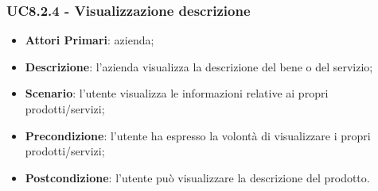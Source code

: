 \subsubsection{UC8.2.4 - Visualizzazione descrizione}
\begin{itemize}
	\item \textbf{Attori Primari}: azienda;
	\item \textbf{Descrizione}: l'azienda visualizza la descrizione del bene o del servizio;
	\item \textbf{Scenario}: l'utente visualizza le informazioni relative ai propri prodotti/servizi;
	\item \textbf{Precondizione}: l'utente ha espresso la volontà di visualizzare i propri prodotti/servizi;
	\item \textbf{Postcondizione}: l'utente può visualizzare la descrizione del prodotto.
\end{itemize}

